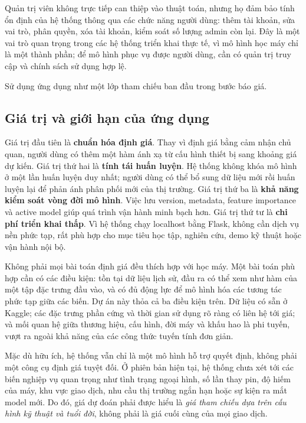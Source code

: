 
Quản trị viên không trực tiếp can thiệp vào thuật toán, nhưng họ đảm bảo tính ổn định của hệ thống thông qua các chức năng người dùng: thêm tài khoản, sửa vai trò, phân quyền, xóa tài khoản, kiểm soát số lượng admin còn lại. Đây là một vai trò quan trọng trong các hệ thống triển khai thực tế, vì mô hình học máy chỉ là một thành phần; để mô hình phục vụ được người dùng, cần có quản trị truy cập và chính sách sử dụng hợp lệ.


 Sử dụng ứng dụng như một lớp tham chiếu ban đầu trong bước báo giá.

\subsection{Giá trị và giới hạn của ứng dụng}


Giá trị đầu tiên là \textbf{chuẩn hóa định giá}. Thay vì định giá bằng cảm nhận chủ quan, người dùng có thêm một hàm ánh xạ từ cấu hình thiết bị sang khoảng giá dự kiến. Giá trị thứ hai là \textbf{tính tái huấn luyện}. Hệ thống không khóa mô hình ở một lần huấn luyện duy nhất; người dùng có thể bổ sung dữ liệu mới rồi huấn luyện lại để phản ánh phân phối mới của thị trường. Giá trị thứ ba là \textbf{khả năng kiểm soát vòng đời mô hình}. Việc lưu version, metadata, feature importance và active model giúp quá trình vận hành minh bạch hơn. Giá trị thứ tư là \textbf{chi phí triển khai thấp}. Vì hệ thống chạy localhost bằng Flask, không cần dịch vụ nền phức tạp, rất phù hợp cho mục tiêu học tập, nghiên cứu, demo kỹ thuật hoặc vận hành nội bộ.


Không phải mọi bài toán định giá đều thích hợp với học máy. Một bài toán phù hợp cần có các điều kiện: tồn tại dữ liệu lịch sử, đầu ra có thể xem như hàm của một tập đặc trưng đầu vào, và có đủ động lực để mô hình hóa các tương tác phức tạp giữa các biến. Dự án này thỏa cả ba điều kiện trên. Dữ liệu có sẵn ở Kaggle; các đặc trưng phần cứng và thời gian sử dụng rõ ràng có liên hệ tới giá; và mối quan hệ giữa thương hiệu, cấu hình, đời máy và khấu hao là phi tuyến, vượt ra ngoài khả năng của các công thức tuyến tính đơn giản.


Mặc dù hữu ích, hệ thống vẫn chỉ là một mô hình hỗ trợ quyết định, không phải một công cụ định giá tuyệt đối. Ở phiên bản hiện tại, hệ thống chưa xét tới các biến nghiệp vụ quan trọng như tình trạng ngoại hình, số lần thay pin, độ hiếm của máy, khu vực giao dịch, nhu cầu thị trường ngắn hạn hoặc sự kiện ra mắt model mới. Do đó, giá dự đoán phải được hiểu là \textit{giá tham chiếu dựa trên cấu hình kỹ thuật và tuổi đời}, không phải là giá cuối cùng của mọi giao dịch.

